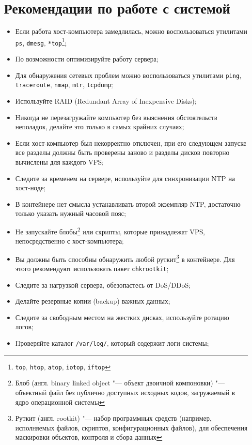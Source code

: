 \section{Рекомендации по работе с системой}
\begin{itemize}
    \item Если работа хост-компьютера замедлилась, можно воспользоваться утилитами \texttt{ps}, \texttt{dmesg}, \texttt{*top}\footnote{\texttt{top}, \texttt{htop}, \texttt{atop}, \texttt{iotop}, \texttt{iftop}};
    \item По возможности оптимизируйте работу сервера;
    \item Для обнаружения сетевых проблем можно воспользоваться утилитами \texttt{ping}, \texttt{traceroute}, \texttt{nmap}, \texttt{mtr}, \texttt{tcpdump};
    \item Используйте RAID (Redundant Array of Inexpensive Disks);
    \item Никогда не перезагружайте компьютер без выяснения обстоятельств неполадок, делайте это только в самых крайних случаях;
    \item Если хост-компьютер был некорректно отключен, при его следующем запуске все разделы должны быть проверены заново и разделы дисков повторно вычислены для каждого VPS;
    \item Следите за временем на сервере, используйте для синхронизации NTP на хост-ноде;
    \item В контейнере нет смысла устанавливать второй экземпляр NTP, достаточно только указать нужный часовой пояс;
    \item Не запускайте блобы\footnote{Блоб (англ. binary linked object "--- объект двоичной компоновки) "--- объектный файл без публично доступных исходных кодов, загружаемый в ядро операционной системы} или скрипты, которые принадлежат VPS, непосредственно с хост-компьютера;
    \item Вы должны быть способны обнаружить любой руткит\footnote{Руткит (англ. rootkit) "--- набор программных средств (например, исполняемых файлов, скриптов, конфигурационных файлов), для обеспечения маскировки объектов, контроля и сбора данных} в контейнере. Для этого рекомендуют использовать пакет \texttt{chkrootkit};
    \item Следите за нагрузкой сервера, обезопастесь от DoS/DDoS;
    \item Делайте резервные копии (backup) важных данных;
    \item Следите за свободным местом на жестких дисках, используйте ротацию логов;
    \item Проверяйте каталог \texttt{/var/log/}, который содержит логи системы;

\end{itemize}
